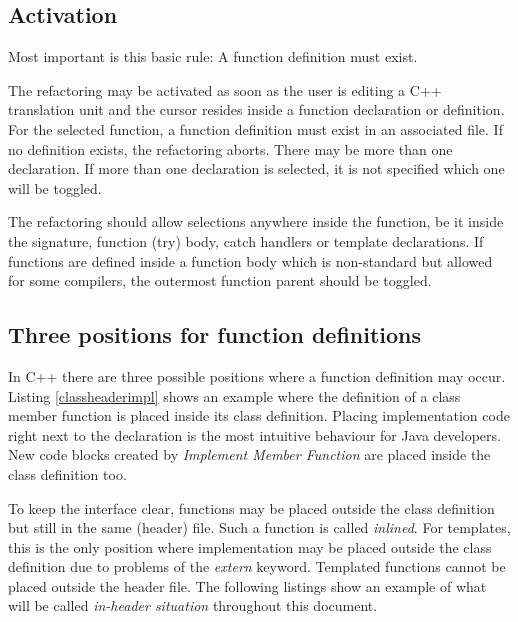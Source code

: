 \subsection{Activation}

Most important is this basic rule: A function definition must exist.

The refactoring may be activated as soon as the user is editing a C++ 
translation unit and the cursor resides inside a function declaration or 
definition. For the selected function, a function definition must exist in an 
associated file. If no definition exists, the refactoring aborts. There may be 
more than one declaration. If more than one declaration is selected, it is not 
specified which one will be toggled.

The refactoring should allow selections anywhere inside the function, be it 
inside the signature, function (try) body, catch handlers or template 
declarations. If functions are defined inside a function body which is 
non-standard but allowed for some compilers, the outermost function parent 
should be toggled.

\subsection{Three positions for function definitions}

In C++ there are three possible positions where a 
function definition may occur. Listing \ref{classheaderimpl} shows an example
where the definition of a class member function is placed inside its class
definition. Placing implementation code right next to the declaration is the
most intuitive behaviour for Java developers. New code blocks created by
\textit{Implement Member Function} are placed inside the class definition too.



To keep the interface clear,  functions may be 
placed outside the class definition but still in the same (header) file. Such a 
function is called \textit{inlined}. For templates, this is the only position 
where implementation may be placed outside the class definition due to problems 
of the \textit{extern} keyword. Templated functions cannot be placed outside the 
header file. The following listings show an example of what will be called 
\textit{in-header situation} throughout this document.

